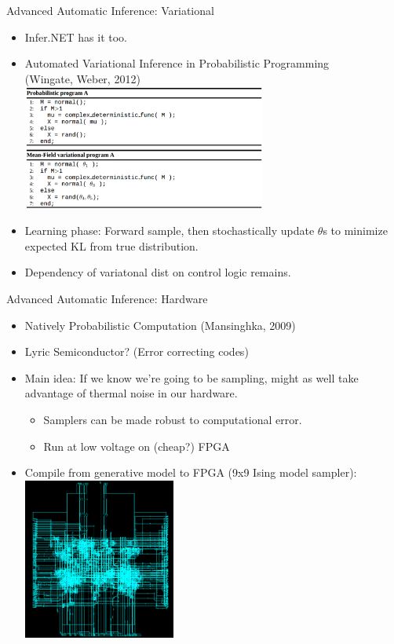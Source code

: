\begin{frame}{Advanced Automatic Inference: Variational}

    \begin{itemize}
      \item Infer.NET has it too.
      \item Automated Variational Inference in Probabilistic Programming
      \\ {\color{DarkBlue}  (Wingate, Weber, 2012) }
      \\\includegraphics[width=8cm]{figures/meanvar}
      \item Learning phase: Forward sample, then stochastically update $\theta$s to minimize expected KL from true distribution.
      \item Dependency of variatonal dist on control logic remains.
    \end{itemize}

\end{frame}


\begin{frame}{Advanced Automatic Inference: Hardware}
    \begin{itemize}
      \item Natively Probabilistic Computation {\color{DarkBlue}  (Mansinghka, 2009) }
      \item Lyric Semiconductor? (Error correcting codes)
      \item Main idea: If we know we're going to be sampling, might as well take advantage of thermal noise in our hardware.
          \begin{itemize}
                \item Samplers can be made robust to computational error.
                \item Run at low voltage on (cheap?) FPGA
          \end{itemize}        
      \item Compile from generative model to FPGA (9x9 Ising model sampler):
      \\\includegraphics[width=5cm]{figures/llvm}
    \end{itemize}
\end{frame}

